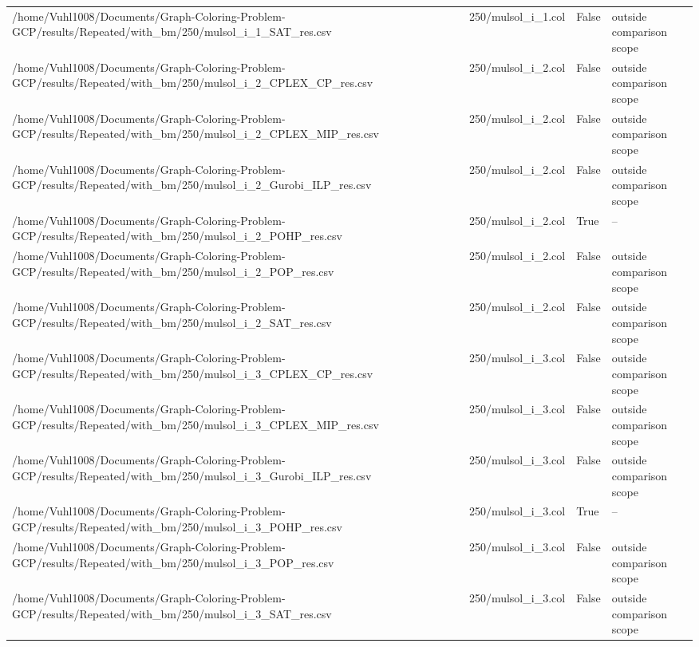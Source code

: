 \begin{table}[htbp]
\begin{tabular}{llll}
/home/Vuhl1008/Documents/Graph-Coloring-Problem-GCP/results/Repeated/with\_bm/250/mulsol\_i\_1\_SAT\_res.csv & 250/mulsol\_i\_1.col & False & outside comparison scope \\
/home/Vuhl1008/Documents/Graph-Coloring-Problem-GCP/results/Repeated/with\_bm/250/mulsol\_i\_2\_CPLEX\_CP\_res.csv & 250/mulsol\_i\_2.col & False & outside comparison scope \\
/home/Vuhl1008/Documents/Graph-Coloring-Problem-GCP/results/Repeated/with\_bm/250/mulsol\_i\_2\_CPLEX\_MIP\_res.csv & 250/mulsol\_i\_2.col & False & outside comparison scope \\
/home/Vuhl1008/Documents/Graph-Coloring-Problem-GCP/results/Repeated/with\_bm/250/mulsol\_i\_2\_Gurobi\_ILP\_res.csv & 250/mulsol\_i\_2.col & False & outside comparison scope \\
/home/Vuhl1008/Documents/Graph-Coloring-Problem-GCP/results/Repeated/with\_bm/250/mulsol\_i\_2\_POHP\_res.csv & 250/mulsol\_i\_2.col & True & -- \\
/home/Vuhl1008/Documents/Graph-Coloring-Problem-GCP/results/Repeated/with\_bm/250/mulsol\_i\_2\_POP\_res.csv & 250/mulsol\_i\_2.col & False & outside comparison scope \\
/home/Vuhl1008/Documents/Graph-Coloring-Problem-GCP/results/Repeated/with\_bm/250/mulsol\_i\_2\_SAT\_res.csv & 250/mulsol\_i\_2.col & False & outside comparison scope \\
/home/Vuhl1008/Documents/Graph-Coloring-Problem-GCP/results/Repeated/with\_bm/250/mulsol\_i\_3\_CPLEX\_CP\_res.csv & 250/mulsol\_i\_3.col & False & outside comparison scope \\
/home/Vuhl1008/Documents/Graph-Coloring-Problem-GCP/results/Repeated/with\_bm/250/mulsol\_i\_3\_CPLEX\_MIP\_res.csv & 250/mulsol\_i\_3.col & False & outside comparison scope \\
/home/Vuhl1008/Documents/Graph-Coloring-Problem-GCP/results/Repeated/with\_bm/250/mulsol\_i\_3\_Gurobi\_ILP\_res.csv & 250/mulsol\_i\_3.col & False & outside comparison scope \\
/home/Vuhl1008/Documents/Graph-Coloring-Problem-GCP/results/Repeated/with\_bm/250/mulsol\_i\_3\_POHP\_res.csv & 250/mulsol\_i\_3.col & True & -- \\
/home/Vuhl1008/Documents/Graph-Coloring-Problem-GCP/results/Repeated/with\_bm/250/mulsol\_i\_3\_POP\_res.csv & 250/mulsol\_i\_3.col & False & outside comparison scope \\
/home/Vuhl1008/Documents/Graph-Coloring-Problem-GCP/results/Repeated/with\_bm/250/mulsol\_i\_3\_SAT\_res.csv & 250/mulsol\_i\_3.col & False & outside comparison scope \\

\end{tabular}
\end{table}
